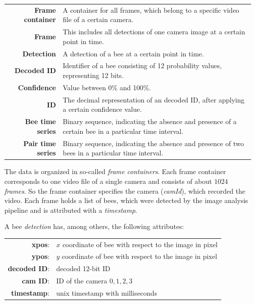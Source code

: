 \begin{table}[!t]
\colorbox{usethiscolorhere}{
\centering
\begin{tabularx}{\textwidth}{@{} r Y @{}}
	\textbf{Frame container} &
	A container for all frames, which belong to a specific video file of a certain camera.\\
	\textbf{Frame} &
	This includes all detections of one camera image at a certain point in time.\\
	\textbf{Detection} &
	A detection of a bee at a certain point in time.\\
	\textbf{Decoded ID} &
	Identifier of a bee consisting of 12 probability values, representing 12 bits.\\
	\textbf{Confidence} &
	Value between 0\% and 100\%.\\
	\textbf{ID} &
	The decimal representation of an decoded ID, after applying a certain confidence value.\\
	\textbf{Bee time series} & Binary sequence, indicating the absence and presence of a certain bee in a particular time interval.\\
	\textbf{Pair time series} & Binary sequence, indicating the absence and presence of two bees in a particular time interval.\\
\end{tabularx}
}
\end{table}

The data is organized in so-called \emph{frame containers}.
Each frame container corresponds to one video file of a single camera and consists of about $1024$ \emph{frames}. So the frame container specifies the camera (\emph{camId}), which recorded the video.
Each frame holds a list of bees, which were detected by the image analysis pipeline and is attributed with a \emph{timestamp}.

A bee \emph{detection} has, among others, the following attributes:

\begin{table}[!h]
\centering
\begin{tabular}{rl}
\textbf{xpos}: & $x$ coordinate of bee with respect to the image in pixel \\
\textbf{ypos}: & $y$ coordinate of bee with respect to the image in pixel \\
\textbf{decoded ID}: & decoded 12-bit ID \\
\textbf{cam ID}: & ID of the camera ${0,1,2,3}$ \\
\textbf{timestamp}: & unix timestamp with milliseconds\\
\end{tabular}
\end{table}

